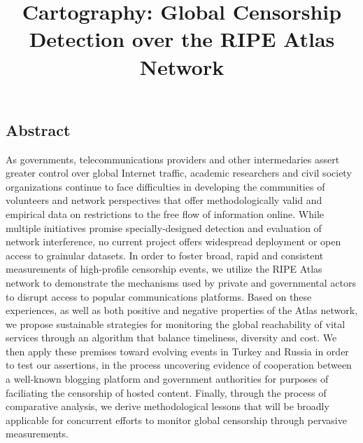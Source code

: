 \documentclass[letterpaper,twocolumn,10pt]{article}
\begin{document}
\date{}

\title{\Large \bf Cartography: Global Censorship Detection over the RIPE Atlas Network}

\author{
}

\maketitle

\thispagestyle{empty}

\subsection*{Abstract}

As governments, telecommunications providers and other intermedaries assert greater control over global Internet traffic, academic researchers and civil society organizations continue to face difficulties in developing the communities of volunteers and network perspectives that offer methodologically valid and empirical data on restrictions to the free flow of information online. While multiple initiatives promise specially-designed detection and evaluation of network interference, no current project offers widespread deployment or open access to grainular datasets. In order to foster broad, rapid and consistent measurements of high-profile censorship events, we utilize the RIPE Atlas network to demonstrate the mechanisms used by private and governmental actors to disrupt access to popular communications platforms. Based on these experiences, as well as both positive and negative properties of the Atlas network, we propose sustainable strategies for monitoring the global reachability of vital services through an algorithm that balance timeliness, diversity and cost. We then apply these premises toward evolving events in Turkey and Russia in order to test our assertions, in the process uncovering evidence of cooperation between a well-known blogging platform and government authorities for purposes of faciliating the censorship of hosted content. Finally, through the process of comparative analysis, we derive methodological lessons that will be broadly applicable for concurrent efforts to monitor global censorship through pervasive measurements.
















\raggedright
\printbibliography

\end{document}
